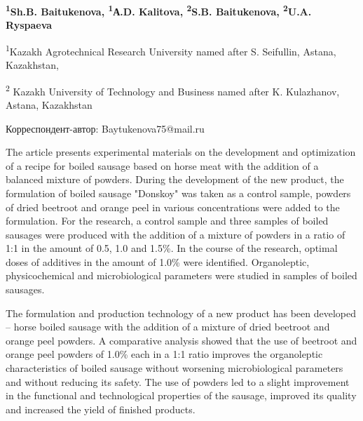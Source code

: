 
\begin{articleheader}

{\bfseries
\textsuperscript{1}Sh.B. Baitukenova\textsuperscript{\envelope },
\textsuperscript{1}А.D. Kalitova,
\textsuperscript{2}S.B. Baitukenova,
\textsuperscript{2}U.A. Ryspaeva
}
\end{articleheader}

\begin{affiliation}
\textsuperscript{1}Kazakh Agrotechnical Research University named after
S. Seifullin, Astana, Kazakhstan,

\textsuperscript{2} Kazakh University of Technology and Business named
after K. Kulazhanov, Astana, Kazakhstan

\raggedright \textsuperscript{\envelope }Корреспондент-автор: Baytukenova75@mail.ru
\end{affiliation}

The article presents experimental materials on the development and
optimization of a recipe for boiled sausage based on horse meat with the
addition of a balanced mixture of powders. During the development of the
new product, the formulation of boiled sausage "Donskoy" was taken as a
control sample, powders of dried beetroot and orange peel in various
concentrations were added to the formulation. For the research, a
control sample and three samples of boiled sausages were produced with
the addition of a mixture of powders in a ratio of 1:1 in the amount of
0.5, 1.0 and 1.5\%. In the course of the research, optimal doses of
additives in the amount of 1.0\% were identified. Organoleptic,
physicochemical and microbiological parameters were studied in samples
of boiled sausages.

The formulation and production technology of a new product has been
developed -- horse boiled sausage with the addition of a mixture of
dried beetroot and orange peel powders. A comparative analysis showed
that the use of beetroot and orange peel powders of 1.0\% each in a 1:1
ratio improves the organoleptic characteristics of boiled sausage
without worsening microbiological parameters and without reducing its
safety. The use of powders led to a slight improvement in the functional
and technological properties of the sausage, improved its quality and
increased the yield of finished products.

